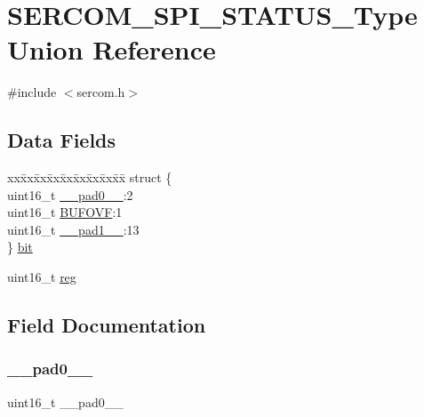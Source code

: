 \hypertarget{union_s_e_r_c_o_m___s_p_i___s_t_a_t_u_s___type}{}\section{S\+E\+R\+C\+O\+M\+\_\+\+S\+P\+I\+\_\+\+S\+T\+A\+T\+U\+S\+\_\+\+Type Union Reference}
\label{union_s_e_r_c_o_m___s_p_i___s_t_a_t_u_s___type}


{\ttfamily \#include $<$sercom.\+h$>$}

\subsection*{Data Fields}
\begin{DoxyCompactItemize}
\item 
\begin{tabbing}
xx\=xx\=xx\=xx\=xx\=xx\=xx\=xx\=xx\=\kill
struct \{\\
\>uint16\_t \mbox{\hyperlink{union_s_e_r_c_o_m___s_p_i___s_t_a_t_u_s___type_a77132c2c26a75f5b8751b235cda23828}{\_\_pad0\_\_}}:2\\
\>uint16\_t \mbox{\hyperlink{union_s_e_r_c_o_m___s_p_i___s_t_a_t_u_s___type_ac1d0751d41834397720be435a519c291}{BUFOVF}}:1\\
\>uint16\_t \mbox{\hyperlink{union_s_e_r_c_o_m___s_p_i___s_t_a_t_u_s___type_ab72e3a1f2f7db8695c60c658f5a0f11a}{\_\_pad1\_\_}}:13\\
\} \mbox{\hyperlink{union_s_e_r_c_o_m___s_p_i___s_t_a_t_u_s___type_aa7f1e6f29755352f3ad11f2b74920d20}{bit}}\\

\end{tabbing}\item 
uint16\+\_\+t \mbox{\hyperlink{union_s_e_r_c_o_m___s_p_i___s_t_a_t_u_s___type_a11760f5020019f4aa8cb02e694f7cc44}{reg}}
\end{DoxyCompactItemize}


\subsection{Field Documentation}
\mbox{\label{union_s_e_r_c_o_m___s_p_i___s_t_a_t_u_s___type_a77132c2c26a75f5b8751b235cda23828}} 
\subsubsection{\texorpdfstring{\_\_pad0\_\_}{\_\_pad0\_\_}}
{\footnotesize\ttfamily uint16\+\_\+t \+\_\+\+\_\+pad0\+\_\+\+\_\+}

